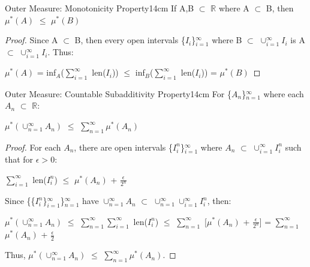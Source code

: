     \vspace{0.5cm}



    \begin{wtheorem}{Outer Measure: Monotonicity Property}{14cm}
        If A,B $\subset$ $\mathbb{R}$ where A $\subset$ B, then
        $\mu^*(A)$ $\leq$ $\mu^*(B)$
    \end{wtheorem}

    \begin{proof}
        Since A $\subset$ B, then every open intervals \{$I_i$\}$_{i=1}^{\infty}$
        where B $\subset$ $\cup_{i=1}^{\infty} I_i$
        is A $\subset$ $\cup_{i=1}^{\infty} I_i$. Thus:

        \hspace{0.5cm}
        $\mu^*(A)$
        = inf$_A$($\sum_{i=1}^{\infty}$ len($I_i$))
        $\leq$ inf$_B$($\sum_{i=1}^{\infty}$ len($I_i$))
        = $\mu^*(B)$
    \end{proof}

    \newpage



    \begin{wtheorem}{Outer Measure: Countable Subadditivity Property}{14cm}
        For \{$A_n$\}$_{n=1}^{\infty}$ where each $A_n$ $\subset$ $\mathbb{R}$:

        \hspace{0.5cm}
        $\mu^*(\cup_{n=1}^{\infty} A_n)$
        $\leq$ $\sum_{n=1}^{\infty} \mu^*(A_n)$
    \end{wtheorem}

    \begin{proof}
        For each $A_n$, there are open intervals \{$I_i^n$\}$_{i=1}^{\infty}$
        where $A_n$ $\subset$ $\cup_{i=1}^{\infty} I_i^n$ such that
        for $\epsilon > 0$:

        \hspace{0.5cm}
        $\sum_{i=1}^{\infty}$ len($I_i^n$)
        $\leq$ $\mu^*(A_n)$ + $\frac{\epsilon}{2^n}$

        Since \{\{$I_i^n$\}$_{i=1}^{\infty}$\}$_{n=1}^{\infty}$
        have $\cup_{n=1}^{\infty} A_n$
        $\subset$ $\cup_{n=1}^{\infty} \cup_{i=1}^{\infty} I_i^n$, then:

        \hspace{0.5cm}
        $\mu^*(\cup_{n=1}^{\infty} A_n)$
        $\leq$ $\sum_{n=1}^{\infty} \sum_{i=1}^{\infty}$ len($I_i^n$)
        $\leq$ $\sum_{n=1}^{\infty}$ [$\mu^*(A_n)$ + $\frac{\epsilon}{2^n}$]
        = $\sum_{n=1}^{\infty}$ $\mu^*(A_n)$ + $\frac{\epsilon}{2}$

        Thus, $\mu^*(\cup_{n=1}^{\infty} A_n)$
        $\leq$ $\sum_{n=1}^{\infty} \mu^*(A_n)$.
    \end{proof}

